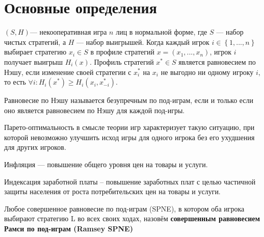 \section{Основные определения}

\begin{definition}	$(S,H)$— некооперативная игра $n$ лиц в нормальной форме, где $S$ — набор чистых стратегий, а $H$ — набор выигрышей. Когда каждый игрок $i \in \left\{1,...,n\right\}$  выбирает стратегию $x_i \in S$  в профиле стратегий $x=(x_1,...,x_n)$, игрок $i$  получает выигрыш $H_i(x)$. Профиль стратегий $x^* \in S$   является равновесием по Нэшу, если изменение своей стратегии с $x_i^*$  на $x_i$  не выгодно ни одному игроку $i$, то есть $\forall i : H_i(x^*) \ge H_i(x_i, x_{-i}^*)$.
\end{definition}
	
\begin{definition}
Равновесие по Нэшу называется безупречным по под-играм, если и только если оно является равновесием по Нэшу для каждой под-игры.
\end{definition}

\begin{definition}
Парето-оптимальность в смысле теории игр характеризует такую ситуацию, при которой невозможно улучшить исход игры для одного игрока без его ухудшения для других игроков.
\end{definition}

\begin{definition}
	Инфляция  — повышение общего уровня цен на товары и услуги.
\end{definition}

\begin{definition}
	Индексация заработной платы – повышение заработных плат с целью частичной защиты населения от роста потребительских цен на товары и услуги.
\end{definition}

\begin{definition}
	Любое совершенное равновесие по под-играм (SPNE), в котором оба игрока выбирают стратегию L во всех своих ходах, назовём \textbf{совершенным равновесием Рамси по под-играм (Ramsey SPNE)}
\end{definition}
